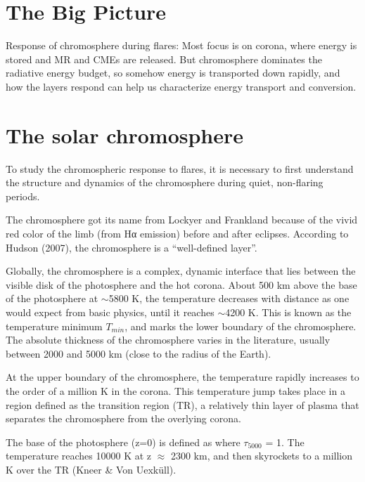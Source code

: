 \section{The Big Picture}


Response of chromosphere during flares:
Most focus is on corona, where energy
is stored and MR and CMEs are released.
But chromosphere dominates the
radiative energy budget, so somehow energy is transported down rapidly, and how
the layers respond can help us characterize energy transport and
conversion.%
%

\clearpage
\section{The solar chromosphere}

To study the chromospheric response to flares, it is necessary
to first understand the structure and dynamics of the chromosphere
during quiet, non-flaring periods.

The chromosphere got its name from Lockyer and Frankland because of the vivid
red color of the limb (from Hα emission) before and after eclipses.
According to Hudson (2007), the chromosphere is a ``well-defined layer''.

Globally, the chromosphere is a complex, dynamic interface that lies between
the visible disk of the photosphere and the hot corona.
About 500 km above the base of the photosphere at $\sim$5800 K, the temperature
decreases with distance as one would expect from basic physics,
until it reaches $\sim$4200 K.
This is known as the temperature minimum $T_{min}$, and
marks the lower boundary of the chromosphere.
The absolute
thickness of the chromosphere varies in the literature, usually between 2000
and 5000 km (close to the radius of the Earth).

At the upper boundary of the chromosphere, the temperature rapidly increases to
the order of a million K in the corona.
This temperature jump takes place in a region defined as the transition
region (TR), a relatively thin layer of plasma that separates the chromosphere
from the overlying corona.

The base of the photosphere (z=0) is defined as where
$\tau_{5000}$ = 1.
The temperature reaches 10000 K at z $\approx$ 2300 km, and then skyrockets
to a million K over the TR (Kneer \& Von Uexküll).


